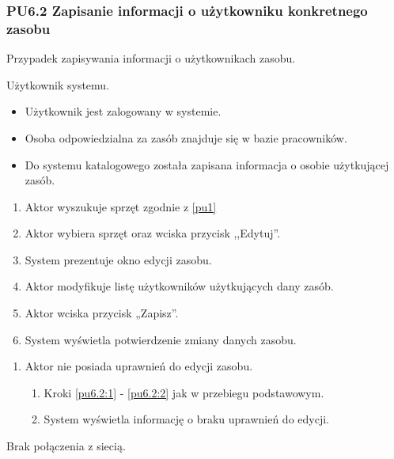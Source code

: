 \subsubsection{PU6.2 Zapisanie informacji o użytkowniku konkretnego zasobu}
Przypadek zapisywania informacji o użytkownikach zasobu.

Użytkownik systemu.

\begin{itemize}
\item Użytkownik jest zalogowany w systemie.
\item Osoba odpowiedzialna za zasób znajduje się w bazie pracowników.
\end{itemize}

\begin{itemize}
\item Do systemu katalogowego została zapisana informacja o osobie użytkującej zasób.
\end{itemize}

\begin{enumerate}
	\item \label{pu6.2:1} Aktor wyszukuje sprzęt zgodnie z \ref{pu1}
	\item \label{pu6.2:2} Aktor wybiera sprzęt oraz wciska przycisk ,,Edytuj''.
	\item System prezentuje okno edycji zasobu.
	\item Aktor modyfikuje listę użytkowników użytkujących dany zasób.
	\item Aktor wciska przycisk „Zapisz”.
	\item System wyświetla potwierdzenie zmiany danych zasobu.
\end{enumerate}

\begin{enumerate}
	\item Aktor nie posiada uprawnień do edycji zasobu.
	\begin{enumerate}[label*=\arabic*.]
		\item Kroki \ref{pu6.2:1} - \ref{pu6.2:2} jak w przebiegu podstawowym.
		\item System wyświetla informację o braku uprawnień do edycji.
	\end{enumerate}
\end{enumerate}

Brak połączenia z siecią.

